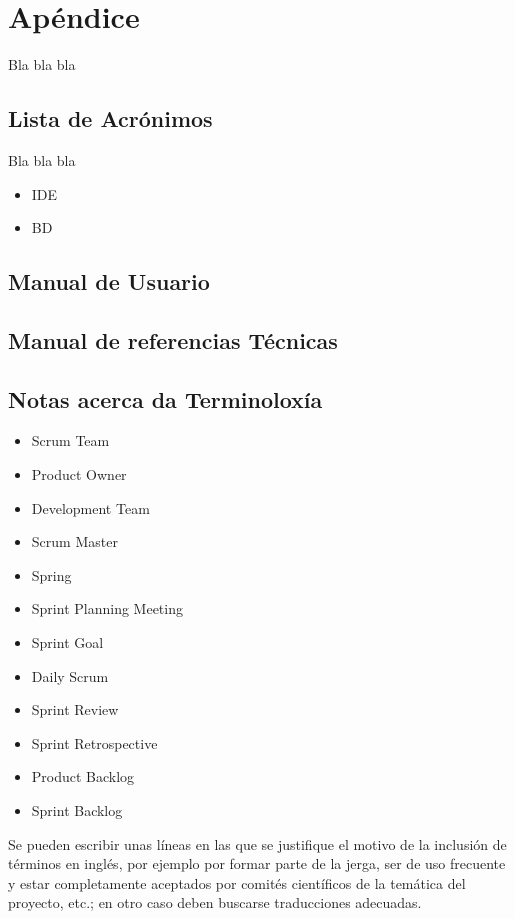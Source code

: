 \chapter{Apéndice}

Bla bla bla

\section{Lista de Acrónimos}

  Bla bla bla
\begin{itemize}
 \item {IDE}
 \item {BD}
\end{itemize}


\section{Manual de Usuario}

\section{Manual de referencias Técnicas}

\section{Notas acerca da Terminoloxía}
\begin{itemize}
	\item{Scrum Team}
	\item{Product Owner}
	\item{Development Team}
	\item{Scrum Master}
	\item{Spring}
	\item{Sprint Planning Meeting}
	\item{Sprint Goal}
	\item{Daily Scrum}
	\item{Sprint Review}
	\item{Sprint Retrospective}
	\item{Product Backlog}
	\item{Sprint Backlog}
	
	
\end{itemize}

  Se pueden escribir unas líneas en las que se justifique
  el motivo de la inclusión de términos en inglés, por ejemplo por formar parte de la
  jerga, ser de uso frecuente y estar completamente aceptados por comités científicos de
  la temática del proyecto, etc.; en otro caso deben buscarse traducciones adecuadas.
